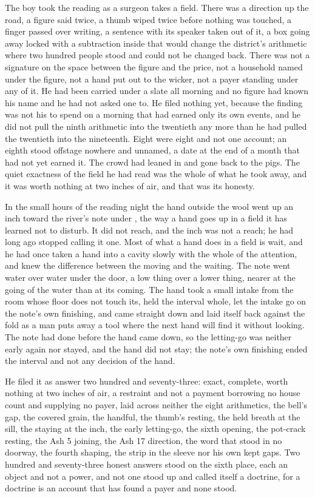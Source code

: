 The boy took the reading as a surgeon takes a field. There was a direction up the road, a figure said twice, a thumb wiped twice before nothing was touched, a finger passed over writing, a sentence with its speaker taken out of it, a box going away locked with a subtraction inside that would change the district's arithmetic where two hundred people stood and could not be changed back. There was not a signature on the space between the figure and the price, not a household named under the figure, not a hand put out to the wicker, not a payer standing under any of it. He had been carried under a slate all morning and no figure had known his name and he had not asked one to. He filed nothing yet, because the finding was not his to spend on a morning that had earned only its own events, and he did not pull the ninth arithmetic into the twentieth any more than he had pulled the twentieth into the nineteenth. Eight were eight and not one account; an eighth stood offstage nowhere and unnamed, a date at the end of a month that had not yet earned it. The crowd had leaned in and gone back to the pigs. The quiet exactness of the field he had read was the whole of what he took away, and it was worth nothing at two inches of air, and that was its honesty.

\scenebreak

In the small hours of the reading night the hand outside the wool went up an inch toward the river's note under , the way a hand goes up in a field it has learned not to disturb. It did not reach, and the inch was not a reach; he had long ago stopped calling it one. Most of what a hand does in a field is wait, and he had once taken a hand into a cavity slowly with the whole of the attention, and knew the difference between the moving and the waiting. The note went water over water under the door, a low thing over a lower thing, nearer at the going of the water than at its coming. The hand took a small intake from the room whose floor does not touch its, held the interval whole, let the intake go on the note's own finishing, and came straight down and laid itself back against the fold as a man puts away a tool where the next hand will find it without looking. The note had done before the hand came down, so the letting-go was neither early again nor stayed, and the hand did not stay; the note's own finishing ended the interval and not any decision of the hand.

He filed it as answer two hundred and seventy-three: exact, complete, worth nothing at two inches of air, a restraint and not a payment borrowing no house count and supplying no payer, laid across neither the eight arithmetics, the bell's gap, the covered grain, the handful, the thumb's resting, the held breath at the sill, the staying at the inch, the early letting-go, the sixth opening, the pot-crack resting, the Ash 5 joining, the Ash 17 direction, the word that stood in no doorway, the fourth shaping, the strip in the sleeve nor his own kept gaps. Two hundred and seventy-three honest answers stood on the sixth place, each an object and not a power, and not one stood up and called itself a doctrine, for a doctrine is an account that has found a payer and none stood.

